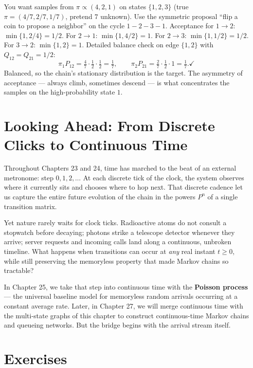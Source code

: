 \begin{example}
\label{ch24:ex-metropolis}
You want samples from $\pi \propto (4, 2, 1)$ on states $\{1,2,3\}$ (true
$\pi = (4/7, 2/7, 1/7)$, pretend $7$ unknown). Use the symmetric proposal ``flip a
coin to propose a neighbor'' on the cycle $1\!-\!2\!-\!3\!-\!1$. Acceptance for
$1\to 2$: $\min\{1, 2/4\} = 1/2$. For $2\to 1$: $\min\{1, 4/2\}=1$. For $2\to 3$:
$\min\{1,1/2\}=1/2$. For $3\to 2$: $\min\{1, 2\}=1$. Detailed balance check on edge
$\{1,2\}$ with $Q_{12}=Q_{21}=1/2$:
\[
  \pi_1 P_{12} = \tfrac47\cdot\tfrac12\cdot\tfrac12 = \tfrac{1}{7},\qquad
  \pi_2 P_{21} = \tfrac27\cdot\tfrac12\cdot 1 = \tfrac{1}{7}. \checkmark
\]
Balanced, so the chain's stationary distribution is the target. The asymmetry of
acceptance --- always climb, sometimes descend --- is what concentrates the
samples on the high-probability state $1$.
\end{example}

\section{Looking Ahead: From Discrete Clicks to Continuous Time}
\label{ch24:looking-ahead}

Throughout Chapters 23 and 24, time has marched to the beat of an external
metronome: step $0, 1, 2, \dots$ At each discrete tick of the clock, the system
observes where it currently sits and chooses where to hop next. That discrete
cadence let us capture the entire future evolution of the chain in the powers
$P^n$ of a single transition matrix.

Yet nature rarely waits for clock ticks. Radioactive atoms do not consult a
stopwatch before decaying; photons strike a telescope detector whenever they
arrive; server requests and incoming calls land along a continuous, unbroken
timeline. What happens when transitions can occur at \emph{any} real instant
$t \ge 0$, while still preserving the memoryless property that made Markov chains
so tractable?

In Chapter 25, we take that step into continuous time with the \textbf{Poisson
process} --- the universal baseline model for memoryless random arrivals
occurring at a constant average rate. Later, in Chapter 27, we will merge
continuous time with the multi-state graphs of this chapter to construct
continuous-time Markov chains and queueing networks. But the bridge begins with
the arrival stream itself.

\section{Exercises}
\label{ch24:exercises}

